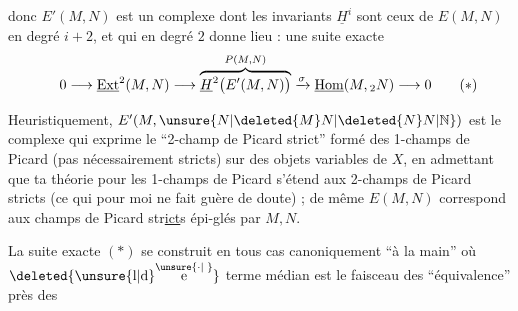 
donc $E'(M,N)$ est un complexe dont les invariants $\underline{H}^{i}$ sont ceux de $E(M,N)$ en degré $i+2$, et qui en degré $2$ donne lieu : une suite exacte
\[
0\longrightarrow\underline{\mathrm{Ext}}^{2}(M,N)\longrightarrow
\overbrace{\underline{H}^{2}\bigl(E'(M,N)\bigr)}^{P(M,N)}
\xrightarrow{\sigma}\underline{\mathrm{Hom}}(M,{}_{2}N)\longrightarrow 0
\tag*{\makebox[0pt][r]{\makebox[\displaywidth][l]{$(*)$}}}
\]

Heuristiquement, $E'(M,\unsure{N|\deleted{M}N|\deleted{N}N|\mathbb{N}})$ est le complexe qui exprime le ``2-champ de Picard strict'' formé des 1-champs de Picard (pas nécessairement stricts)  sur des objets variables de $X$, en admettant que ta théorie pour les 1-champs de Picard  s'étend aux 2-champs de Picard stricts (ce qui pour moi ne fait guère de doute) ; de même $E(M,N)$ correspond aux champs de Picard str\uline{ict}s épi-glés par $M,N$.

La suite exacte $(*)$ se construit en tous cas canoniquement ``à la main''\unsure{,|)} où $\deleted{\unsure{\mathrm{l}|\mathrm{d}}\overset{\unsure{\cdot|\phantom{\cdot}}}{\mathrm{e}}}$ terme médian est le faisceau des    ``équivalence'' près des

